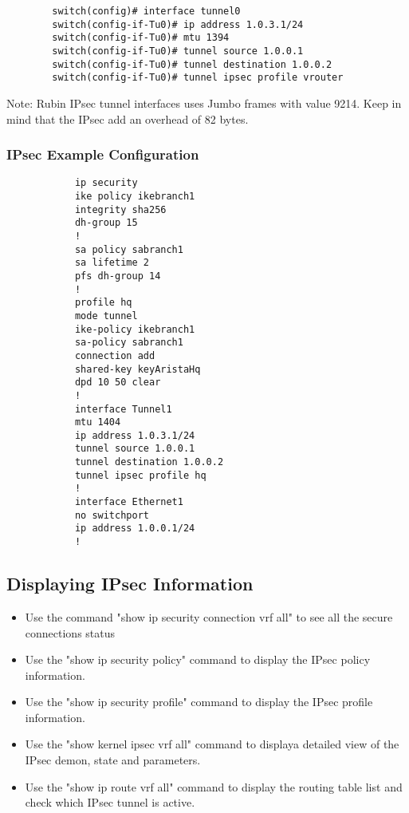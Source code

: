 \begin{enumerate}
        \begin{lstlisting}
        switch(config)# interface tunnel0  
        switch(config-if-Tu0)# ip address 1.0.3.1/24  
        switch(config-if-Tu0)# mtu 1394  
        switch(config-if-Tu0)# tunnel source 1.0.0.1  
        switch(config-if-Tu0)# tunnel destination 1.0.0.2  
        switch(config-if-Tu0)# tunnel ipsec profile vrouter
        \end{lstlisting}
        Note: Rubin IPsec tunnel interfaces uses Jumbo frames with value 9214. Keep in mind that the IPsec add an overhead of 82 bytes.
\end{enumerate}    
    
\subsubsection{IPsec Example Configuration}
        \begin{lstlisting}
            ip security
            ike policy ikebranch1
            integrity sha256
            dh-group 15
            !
            sa policy sabranch1
            sa lifetime 2
            pfs dh-group 14
            !
            profile hq
            mode tunnel
            ike-policy ikebranch1
            sa-policy sabranch1
            connection add
            shared-key keyAristaHq
            dpd 10 50 clear
            !
            interface Tunnel1
            mtu 1404
            ip address 1.0.3.1/24
            tunnel source 1.0.0.1
            tunnel destination 1.0.0.2
            tunnel ipsec profile hq
            !
            interface Ethernet1
            no switchport
            ip address 1.0.0.1/24
            !        
        \end{lstlisting}

\subsection{Displaying IPsec Information}
    \begin{itemize}
        \item Use the command "show ip security connection  vrf all" to see all the secure connections status
        \item Use the "show ip security policy" command to display the IPsec policy information.
        \item Use the "show ip security profile" command to display the IPsec profile information.
        \item Use the "show kernel ipsec vrf all" command to displaya detailed view of the IPsec demon, state and parameters.
        \item Use the "show ip route vrf all" command to display the routing table list and check which IPsec tunnel is active.
    \end{itemize}
    